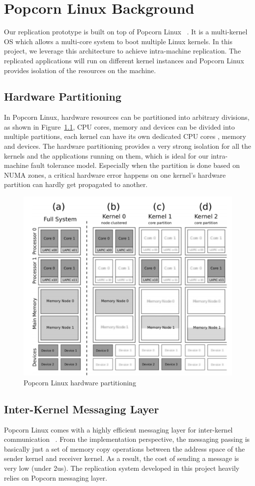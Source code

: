\chapter{Popcorn Linux Background}
Our replication prototype is built on top of Popcorn Linux ~\cite{barbalace2014popcorn}. It is a multi-kernel OS which allows a multi-core system to boot multiple Linux kernels. In this project, we leverage this architecture to achieve intra-machine replication. The replicated applications will run on different kernel instances and Popcorn Linux provides isolation of the resources on the machine.
\section{Hardware Partitioning}
In Popcorn Linux, hardware resources can be partitioned into arbitrary divisions, as shown in Figure~\ref{f:popcorn_arch}, CPU cores, memory and devices can be divided into multiple partitions, each kernel can have its own dedicated CPU cores , memory and devices. The hardware partitioning provides a very strong isolation for all the kernels and the applications running on them, which is ideal for our intra-machine fault tolerance model. Especially when the partition is done based on NUMA zones, a critical hardware error happens on one kernel's hardware partition can hardly get propagated to another.

\begin{figure}[!ht]
\centering
\includegraphics[width=.6\columnwidth]{figures/popcorn_arch}
 \caption{Popcorn Linux hardware partitioning}
 \label{f:popcorn_arch}
\end{figure}

\section{Inter-Kernel Messaging Layer}
Popcorn Linux comes with a highly efficient messaging layer for inter-kernel communication ~\cite{shelton2013popcorn}. From the implementation perspective, the messaging passing is basically just a set of memory copy operations between the address space of the sender kernel and receiver kernel. As a result, the cost of sending a message is very low (under 2us). The replication system developed in this project heavily relies on Popcorn messaging layer.

